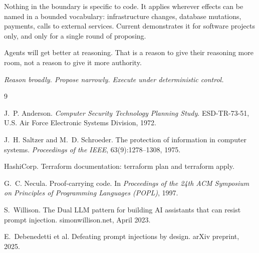 \documentclass[10pt,letterpaper]{article}
\newcommand{\code}[1]{{\fontencoding{OT1}\fontfamily{cmtt}\selectfont #1}}
\begin{document}
Nothing in the boundary is specific to code. It applies wherever effects can be named in a
bounded vocabulary: infrastructure changes, database mutations, payments, calls to external
services. Current demonstrates it for software projects only, and only for a single round of
proposing.

Agents will get better at reasoning. That is a reason to give their reasoning more room, not
a reason to give it more authority.

\begin{keyline}
\itshape Reason broadly. Propose narrowly. Execute under deterministic control.
\end{keyline}

\begingroup
\small
\renewcommand{\refname}{References}
\begin{thebibliography}{9}
\setlength{\itemsep}{0.25em}

 J.~P. Anderson. \emph{Computer Security Technology Planning Study}.
  ESD-TR-73-51, U.S. Air Force Electronic Systems Division, 1972.

 J.~H. Saltzer and M.~D. Schroeder. The protection of information in
  computer systems. \emph{Proceedings of the IEEE}, 63(9):1278--1308, 1975.

 HashiCorp. Terraform documentation: \code{terraform plan} and
  \code{terraform apply}.

 G.~C. Necula. Proof-carrying code. In \emph{Proceedings of the 24th ACM
  Symposium on Principles of Programming Languages (POPL)}, 1997.

 S.~Willison. The Dual LLM pattern for building AI assistants that can
  resist prompt injection. \mbox{simonwillison.net}, April 2023.

 E.~Debenedetti et al. Defeating prompt injections by design. arXiv
  preprint, 2025.

\end{thebibliography}
\endgroup
\end{document}
